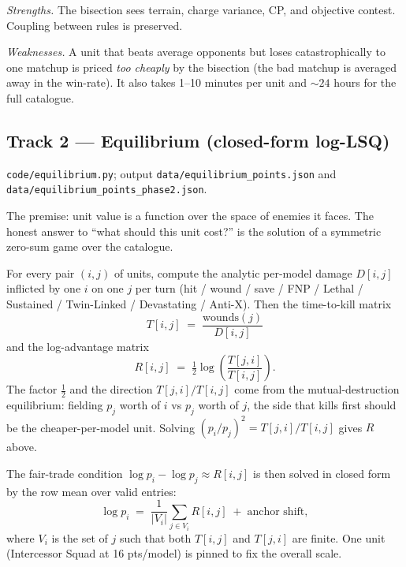 \documentclass[11pt,a4paper]{article}
\begin{document}
\emph{Strengths.} The bisection sees terrain, charge variance, CP, and
objective contest. Coupling between rules is preserved.

\emph{Weaknesses.} A unit that beats average opponents but loses
catastrophically to one matchup is priced \emph{too cheaply} by the
bisection (the bad matchup is averaged away in the win-rate). It also
takes 1--10 minutes per unit and ${\sim}24$ hours for the full catalogue.

\subsection{Track 2 --- Equilibrium (closed-form log-LSQ)}
\texttt{code/equilibrium.py}; output \texttt{data/equilibrium\_points.json}
and \texttt{data/equilibrium\_points\_phase2.json}.

The premise: unit value is a function over the space of enemies it
faces. The honest answer to ``what should this unit cost?'' is the
solution of a symmetric zero-sum game over the catalogue.

For every pair $(i, j)$ of units, compute the analytic per-model damage
$D[i, j]$ inflicted by one $i$ on one $j$ per turn (hit / wound /
save / FNP / Lethal / Sustained / Twin-Linked / Devastating / Anti-X).
Then the time-to-kill matrix
\[
  T[i, j] \;=\; \frac{\text{wounds}(j)}{D[i, j]}
\]
and the log-advantage matrix
\[
  R[i, j] \;=\; \tfrac{1}{2} \log\!\left( \frac{T[j, i]}{T[i, j]} \right).
\]
The factor $\tfrac{1}{2}$ and the direction $T[j, i] / T[i, j]$ come
from the mutual-destruction equilibrium: fielding $p_j$ worth of $i$ vs
$p_j$ worth of $j$, the side that kills first should be the cheaper-per-model
unit. Solving $(p_i / p_j)^2 = T[j, i] / T[i, j]$ gives $R$ above.

The fair-trade condition $\log p_i - \log p_j \approx R[i, j]$ is then
solved in closed form by the row mean over valid entries:
\[
  \log p_i \;=\; \frac{1}{|V_i|} \sum_{j \in V_i} R[i, j] \;+\; \text{anchor shift},
\]
where $V_i$ is the set of $j$ such that both $T[i, j]$ and $T[j, i]$
are finite. One unit (Intercessor Squad at 16 pts/model) is pinned to
fix the overall scale.
\end{document}
